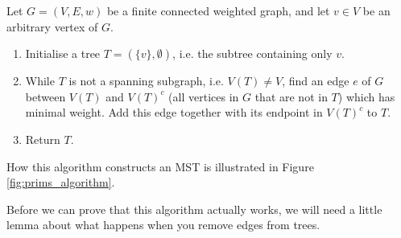 \documentclass[nobib]{tufte-handout}
\begin{document}
\begin{definition}
  Let $G = (V,E,w)$ be a finite connected weighted graph, and let $v \in V$ be an arbitrary vertex of $G$.
\begin{enumerate}
    \item Initialise a tree $T = (\{v\}, \emptyset)$, i.e. the subtree containing only $v$.
    \item While $T$ is not a spanning subgraph, i.e. $V(T) \neq V$, find an edge $e$ of $G$ between $V(T)$ and $V(T)^c$ (all vertices in $G$ that are not in $T$) which has minimal weight. Add this edge together with its endpoint in $V(T)^c$ to $T$.
    \item Return $T$.
    \end{enumerate}
  How this algorithm constructs an MST is illustrated in Figure \ref{fig:prims_algorithm}.
\end{definition}

Before we can prove that this algorithm actually works, we will need a little lemma about what happens when you remove edges from trees.
\end{document}
